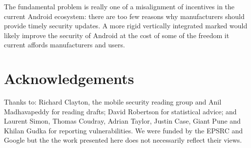 \documentclass{llncs}
\newcommand{\identifying}[1]{#1}%
\begin{document}
The fundamental problem is really one of a misalignment of incentives in the current Android ecosystem: there are too few reasons why manufacturers should provide timely security updates.
A more rigid vertically integrated marked would likely improve the security of Android at the cost of some of the freedom it current affords manufacturers and users.

\identifying{
\section*{Acknowledgements}
Thanks to: Richard Clayton, the mobile security reading group and Anil Madhavapeddy for reading drafts;
David Robertson for statistical advice;
and Laurent Simon, Thomas Coudray, Adrian Taylor, Justin Case, Giant Pune and Khilan Gudka for reporting vulnerabilities.
We were funded by the EPSRC and Google but the the work presented here does not necessarily reflect their views.
}

\printbibliography
\end{document}
